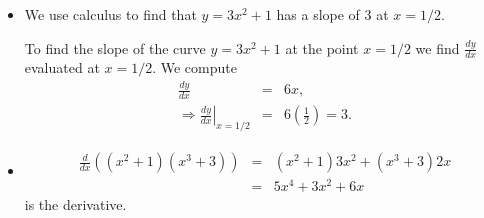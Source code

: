 \begin{itemize}
\begin{goodexample}
We first check that $(1,3)$ is a point on the curve by plugging these
values in: $3=1+2/1$. 
  The derivative of the curve $y = x + \frac{2}{x}$ is
\begin{equation}
    \frac{dy}{dx} = 1 - \frac{2}{x^2}.
\end{equation}
  A line tangent to the curve at the point $(1,3)$ will have slope
  \begin{displaymath}
    \left. \frac{dy}{dx} \right| _{x=1} = 1 - \frac{2}{(-1)^2} = -1.
  \end{displaymath}
  Using the point-slope formula with $m = -1$, $x_0 = 1$, and $y_0 = 3$ gives
  the formula for the line $y - 3 = -1(x-1)$.  Solving for y and
  simplifying gives
  \begin{displaymath}
    y = -x + 4.
  \end{displaymath}
  This is the equation of the line tangent to the curve at that point.
\end{goodexample}  


    
\item
\begin{badexample}
      We use calculus to find that $y = 3x^2+1$ has a slope of $3$ at
      $x = 1/2$.
\end{badexample}

\begin{goodexample}
    To find the slope of the curve $y = 3x^2+1$ at the point $x = 1/2$
    we find $\frac{dy}{dx}$ evaluated at $x = 1/2$. We compute
    \begin{eqnarray*}
      \frac{dy}{dx} &  = &  6x,  \\  
      \Rightarrow \left. \frac{dy}{dx} \right| _{x=1/2} & = & 6 \left( \frac{1}{2}
      \right) = 3. 
    \end{eqnarray*}
\end{goodexample}

\item
\begin{badexample}
    \begin{eqnarray*}
      \frac{d}{dx}\left( (x^2 + 1) (x^3 +3) \right) &  = & 
      (x^2+1)3x^2 +(x^3+3)2x \\ 
      &  = & 5x^4+3x^2+6x
    \end{eqnarray*}
    is the derivative.
\end{badexample}
    

\end{itemize}
